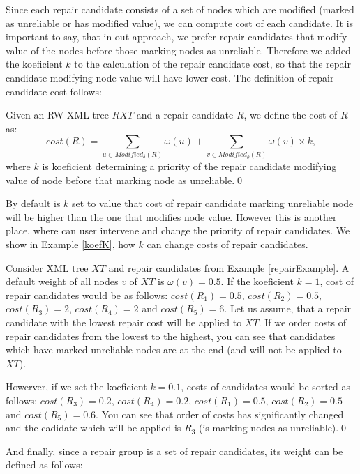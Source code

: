 Since each repair candidate consists of a set of nodes which are modified (marked as unreliable or has modified value), we can compute cost of each candidate. It is important to say, that in out approach, we prefer repair candidates that modify value of the nodes before those marking nodes as unreliable. Therefore we added the koeficient $k$ to the calculation of the repair candidate cost, so that the repair candidate modifying node value will have lower cost. The definition of repair candidate cost follows:

\begin{define}
Given an RW-XML tree $RXT$ and a repair candidate $R$, we define the cost of $R$ as:
$$cost(R) = \sum_{u \in Modified_\delta(R)} \omega(u) + \sum_{v \in Modified_\varrho(R)} \omega(v) \times k,$$
where $k$ is koeficient determining a priority of the repair candidate modifying value of node before that  marking node as unreliable.\qed
\end{define}

By default is $k$ set to value that cost of repair candidate marking unreliable node will be higher than the one that modifies node value. However this is another place, where can user intervene and change the priority of repair candidates. We show in Example \ref{koefK}, how $k$ can change costs of repair candidates.

\begin{example}\label{koefK}
Consider XML tree $XT$ and repair candidates from Example \ref{repairExample}. A default weight of all nodes $v$ of $XT$ is $\omega(v) = 0.5$. If the koeficient $k = 1$, cost of repair candidates would be as follows: $cost(R_1) = 0.5$, $cost(R_2) = 0.5$, $cost(R_3) = 2$, $cost(R_4) = 2$ and $cost(R_5) = 6$.
Let us assume, that a repair candidate with the lowest repair cost will be applied to $XT$. If we order costs of repair candidates from the lowest to the highest, you can see that candidates which have marked unreliable nodes are at the end (and will not be applied to $XT$).

Howerver, if we set the koeficient $k = 0.1$, costs of candidates would be sorted as follows: $cost(R_3) = 0.2$, $cost(R_4) = 0.2$, $cost(R_1) = 0.5$, $cost(R_2)  = 0.5$ and $cost(R_5) = 0.6$. You can see that order of costs has significantly changed and the cadidate which will be applied is $R_3$ (is marking nodes as unreliable).\qed
\end{example}

And finally, since a repair group is a set of repair candidates, its weight can be defined as follows:

